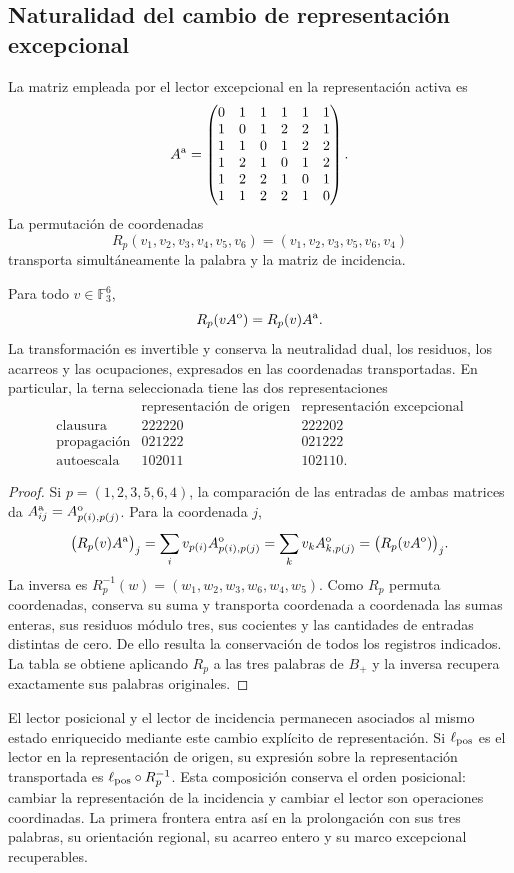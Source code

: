 \subsection{Naturalidad del cambio de representación excepcional}

La matriz empleada por el lector excepcional en la representación activa es
\[
A^{\rm a}=\begin{pmatrix}
0&1&1&1&1&1\\1&0&1&2&2&1\\1&1&0&1&2&2\\
1&2&1&0&1&2\\1&2&2&1&0&1\\1&1&2&2&1&0
\end{pmatrix}.
\]
La permutación de coordenadas
\[
R_p(v_1,v_2,v_3,v_4,v_5,v_6)
=(v_1,v_2,v_3,v_5,v_6,v_4)
\]
transporta simultáneamente la palabra y la matriz de incidencia.

\begin{theorem}
\label{r36c:thm:cambio}
Para todo $v\in\mathbb F_3^6$,
\[
R_p(vA^{\rm o})=R_p(v)A^{\rm a}.
\]
La transformación es invertible y conserva la neutralidad dual, los
residuos, los acarreos y las ocupaciones, expresados en las coordenadas
transportadas. En particular, la terna seleccionada tiene las dos
representaciones
\[
\begin{array}{c|c|c}
&\text{representación de origen}&\text{representación excepcional}\\\hline
\text{clausura}&222220&222202\\
\text{propagación}&021222&021222\\
\text{autoescala}&102011&102110.
\end{array}
\]
\end{theorem}
\begin{proof}
Si $p=(1,2,3,5,6,4)$, la comparación de las entradas de ambas matrices
da $A^{\rm a}_{ij}=A^{\rm o}_{p(i),p(j)}$. Para la coordenada $j$,
\[
\bigl(R_p(v)A^{\rm a}\bigr)_j
=\sum_i v_{p(i)}A^{\rm o}_{p(i),p(j)}
=\sum_kv_kA^{\rm o}_{k,p(j)}
=\bigl(R_p(vA^{\rm o})\bigr)_j.
\]
La inversa es
$R_p^{-1}(w)=(w_1,w_2,w_3,w_6,w_4,w_5)$.
Como $R_p$ permuta coordenadas, conserva su suma y transporta
coordenada a coordenada las sumas enteras, sus residuos módulo tres,
sus cocientes y las cantidades de entradas distintas de cero. De ello
resulta la conservación de todos los registros indicados. La tabla se
obtiene aplicando $R_p$ a las tres palabras de $B_+$ y la inversa
recupera exactamente sus palabras originales.
\end{proof}

El lector posicional y el lector de incidencia permanecen asociados al
mismo estado enriquecido mediante este cambio explícito de
representación. Si $\ell_{\rm pos}$ es el lector en la representación
de origen, su expresión sobre la representación transportada es
$\ell_{\rm pos}\circ R_p^{-1}$. Esta composición conserva el orden
posicional: cambiar la representación de la incidencia y cambiar el
lector son operaciones coordinadas. La primera frontera entra así en
la prolongación con sus tres palabras, su orientación regional, su
acarreo entero y su marco excepcional recuperables.
